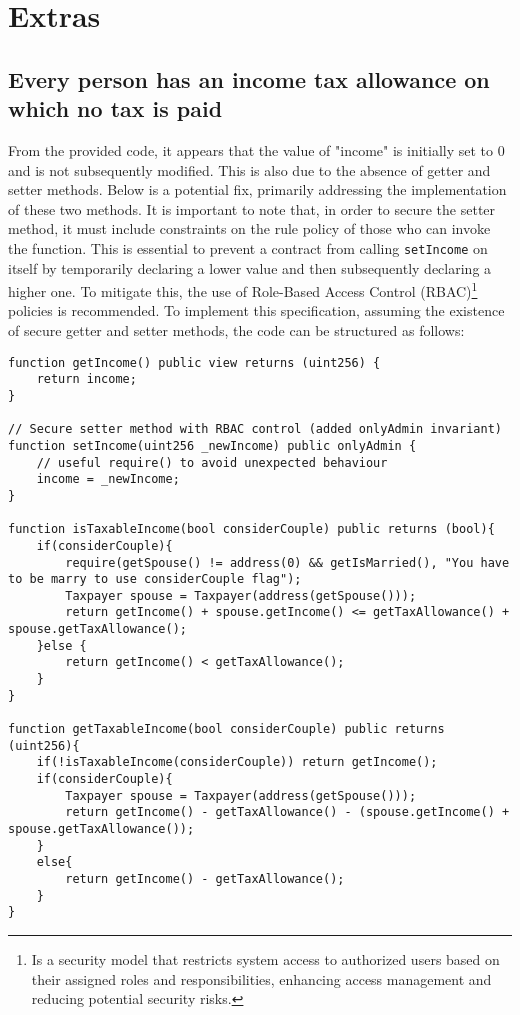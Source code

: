 \documentclass{article}
\begin{document}
\section{Extras}
\subsection{Every person has an income tax allowance on which no tax is paid}
From the provided code, it appears that the value of "income" is initially set to 0 and is not subsequently modified. This is also due to the absence of getter and setter methods. Below is a potential fix, primarily addressing the implementation of these two methods. It is important to note that, in order to secure the setter method, it must include constraints on the rule policy of those who can invoke the function. This is essential to prevent a contract from calling \texttt{setIncome} on itself by temporarily declaring a lower value and then subsequently declaring a higher one. To mitigate this, the use of Role-Based Access Control (RBAC)\footnote{Is a security model that restricts system access to authorized users based on their assigned roles and responsibilities, enhancing access management and reducing potential security risks.} policies is recommended.
\break
To implement this specification, assuming the existence of secure getter and setter methods, the code can be structured as follows:
\begin{verbatim}
function getIncome() public view returns (uint256) {
    return income;
}

// Secure setter method with RBAC control (added onlyAdmin invariant)
function setIncome(uint256 _newIncome) public onlyAdmin {
    // useful require() to avoid unexpected behaviour
    income = _newIncome;
}

function isTaxableIncome(bool considerCouple) public returns (bool){
    if(considerCouple){
        require(getSpouse() != address(0) && getIsMarried(), "You have to be marry to use considerCouple flag");
        Taxpayer spouse = Taxpayer(address(getSpouse()));
        return getIncome() + spouse.getIncome() <= getTaxAllowance() + spouse.getTaxAllowance();
    }else {
        return getIncome() < getTaxAllowance();
    }
}

function getTaxableIncome(bool considerCouple) public returns (uint256){
    if(!isTaxableIncome(considerCouple)) return getIncome();
    if(considerCouple){
        Taxpayer spouse = Taxpayer(address(getSpouse()));
        return getIncome() - getTaxAllowance() - (spouse.getIncome() + spouse.getTaxAllowance());
    }
    else{
        return getIncome() - getTaxAllowance();
    }
}

\end{verbatim}
\end{document}
